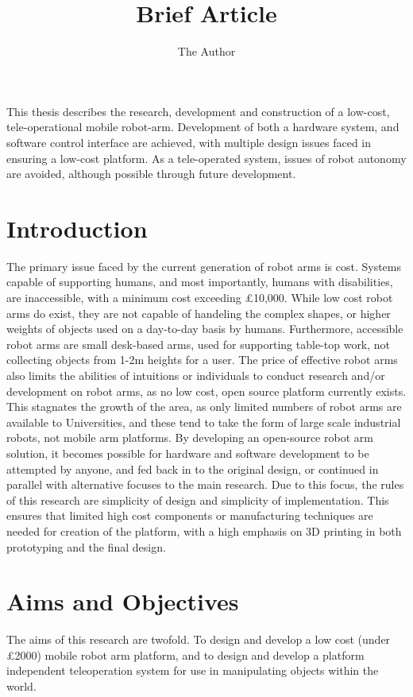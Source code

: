 \documentclass[11pt]{article} %
\title{Brief Article}
\author{The Author}
\begin{document}
\maketitle

\abstract
This thesis describes the research, development and construction of a low-cost, tele-operational mobile robot-arm. Development of both a hardware system, and software control interface are achieved, with multiple design issues faced in ensuring a low-cost platform.
As a tele-operated system, issues of robot autonomy are avoided, although possible through future development.


\section{Introduction}
The primary issue faced by the current generation of robot arms is cost. Systems capable of supporting humans, and most importantly, humans with disabilities, are inaccessible, with a minimum cost exceeding £10,000. While low cost robot arms do exist, they are not capable of handeling the complex shapes, or higher weights of objects used on a day-to-day basis by humans. Furthermore, accessible robot arms are small desk-based arms, used for supporting table-top work, not collecting objects from 1-2m heights for a user. 
The price of effective robot arms also limits the abilities of intuitions or individuals to conduct research and/or development on robot arms, as no low cost, open source platform currently exists. This stagnates the growth of the area, as only limited numbers of robot arms are available to Universities, and these tend to take the form of large scale industrial robots, not mobile arm platforms.
By developing an open-source robot arm solution, it becomes possible for hardware and software development to be attempted by anyone, and fed back in to the original design, or continued in parallel with alternative focuses to the main research.
Due to this focus, the rules of this research are simplicity of design and simplicity of implementation. This ensures that limited high cost components or manufacturing techniques are needed for creation of the platform, with a high emphasis on 3D printing in both prototyping and the final design.

\section{Aims and Objectives}
The aims of this research are twofold. To design and develop a low cost (under £2000) mobile robot arm platform, and to design and develop a platform independent teleoperation system for use in manipulating objects within the world.
\end{document}
